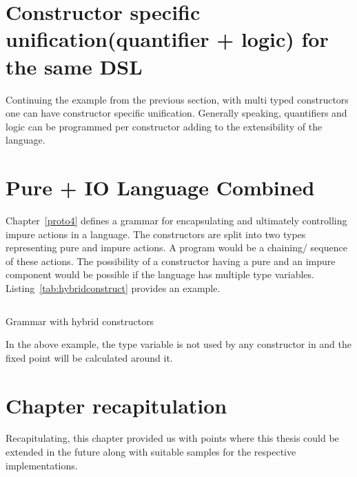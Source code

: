 \documentclass[thesis-solanki.tex]{subfiles}
\begin{document}
\section{Constructor specific unification(quantifier + logic) for the same DSL}
Continuing the example from the previous section, with multi typed constructors one can have constructor specific unification. Generally 
speaking, quantifiers and logic can be programmed per constructor adding to the extensibility of the language.   

\section{Pure + IO Language Combined}
Chapter~\ref{proto4} defines a grammar for encapsulating and ultimately controlling impure actions in a language. The constructors are split
into two types representing pure and impure actions. A program would be a chaining/ sequence of these actions. The possibility of a 
constructor having a pure and an impure component would be possible if the language has multiple type variables. 
Listing~\ref{tab:hybridconstruct} provides an example.


\begin{code-list}[H]
\begin{singlespace}
\inputminted{haskell}{haskell-proto4-hybrid-construct.hs}
\end{singlespace}
\caption{Grammar with hybrid constructors}
\label{tab:hybridconstruct}
\end{code-list}

In the above example, the  type variable is not used by any constructor in  and the fixed 
point will be calculated around it. 

\section{Chapter recapitulation}
Recapitulating, this chapter provided us with points where this thesis could be extended in the future along with suitable samples for the
respective implementations.


\ifMain
\begin{scope}
  \nolinenumbers
  \enotesize
  \par
  \begin{singlespace}
  \setlength{\parskip}{12pt plus 2pt minus 1pt}
  \theendnotes
  \par
  \end{singlespace}
\end{scope}
\fi
\end{document}
